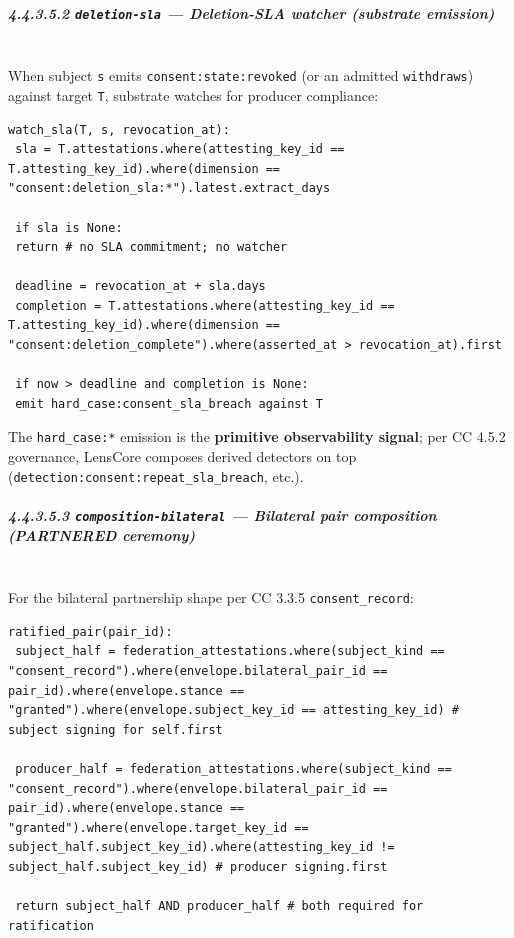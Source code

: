 \documentclass[11pt]{article}
\begin{document}
\subparagraph{4.4.3.5.2 \texttt{deletion-sla} — Deletion-SLA watcher (substrate emission)}\mbox{}\\


When subject \texttt{s} emits \texttt{consent:state:revoked} (or an admitted \texttt{withdraws}) against target \texttt{T}, substrate watches for producer compliance:


\begin{lstlisting}
watch_sla(T, s, revocation_at):
 sla = T.attestations.where(attesting_key_id == T.attesting_key_id).where(dimension == "consent:deletion_sla:*").latest.extract_days

 if sla is None:
 return # no SLA commitment; no watcher

 deadline = revocation_at + sla.days
 completion = T.attestations.where(attesting_key_id == T.attesting_key_id).where(dimension == "consent:deletion_complete").where(asserted_at > revocation_at).first

 if now > deadline and completion is None:
 emit hard_case:consent_sla_breach against T
\end{lstlisting}

The \texttt{hard\_case:*} emission is the \textbf{primitive observability signal}; per CC 4.5.2 governance, LensCore composes derived detectors on top (\texttt{detection:consent:repeat\_sla\_breach}, etc.).


\subparagraph{4.4.3.5.3 \texttt{composition-bilateral} — Bilateral pair composition (PARTNERED ceremony)}\mbox{}\\


For the bilateral partnership shape per CC 3.3.5 \texttt{consent\_record}:


\begin{lstlisting}
ratified_pair(pair_id):
 subject_half = federation_attestations.where(subject_kind == "consent_record").where(envelope.bilateral_pair_id == pair_id).where(envelope.stance == "granted").where(envelope.subject_key_id == attesting_key_id) # subject signing for self.first

 producer_half = federation_attestations.where(subject_kind == "consent_record").where(envelope.bilateral_pair_id == pair_id).where(envelope.stance == "granted").where(envelope.target_key_id == subject_half.subject_key_id).where(attesting_key_id != subject_half.subject_key_id) # producer signing.first

 return subject_half AND producer_half # both required for ratification
\end{lstlisting}
\end{document}
